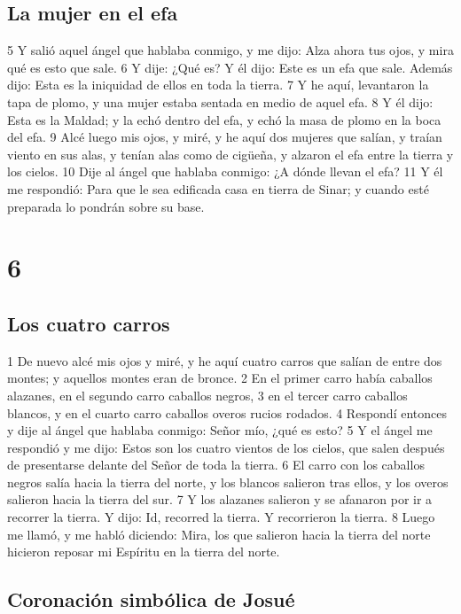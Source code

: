\section*{La mujer en el efa}

5 Y salió aquel ángel que hablaba conmigo, y me dijo: Alza ahora tus ojos, y mira qué es esto que sale.
6 Y dije: ¿Qué es? Y él dijo: Este es un efa que sale. Además dijo: Esta es la iniquidad de ellos en toda la tierra.
7 Y he aquí, levantaron la tapa de plomo, y una mujer estaba sentada en medio de aquel efa. 
8 Y él dijo: Esta es la Maldad; y la echó dentro del efa, y echó la masa de plomo en la boca del efa.
9 Alcé luego mis ojos, y miré, y he aquí dos mujeres que salían, y traían viento en sus alas, y tenían alas como de cigüeña, y alzaron el efa entre la tierra y los cielos.
10 Dije al ángel que hablaba conmigo: ¿A dónde llevan el efa?
11 Y él me respondió: Para que le sea edificada casa en tierra de Sinar; y cuando esté preparada lo pondrán sobre su base.

\chapter{6}

\section*{Los cuatro carros}

1 De nuevo alcé mis ojos y miré, y he aquí cuatro carros que salían de entre dos montes; y aquellos montes eran de bronce.
2 En el primer carro había caballos alazanes, en el segundo carro caballos negros, 
3 en el tercer carro caballos blancos, y en el cuarto carro caballos overos rucios rodados.
4 Respondí entonces y dije al ángel que hablaba conmigo: Señor mío, ¿qué es esto?
5 Y el ángel me respondió y me dijo: Estos son los cuatro vientos de los cielos, que salen después de presentarse delante del Señor de toda la tierra.
6 El carro con los caballos negros salía hacia la tierra del norte, y los blancos salieron tras ellos, y los overos salieron hacia la tierra del sur.
7 Y los alazanes salieron y se afanaron por ir a recorrer la tierra. Y dijo: Id, recorred la tierra. Y recorrieron la tierra.
8 Luego me llamó, y me habló diciendo: Mira, los que salieron hacia la tierra del norte hicieron reposar mi Espíritu en la tierra del norte.

\section*{Coronación simbólica de Josué}

